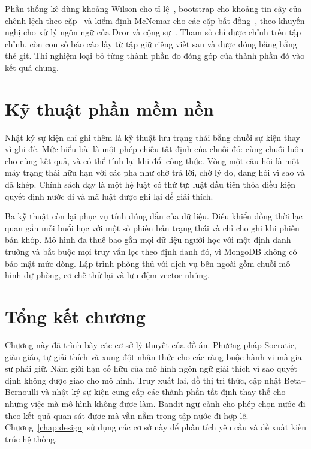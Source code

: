 Phần thống kê dùng khoảng Wilson cho tỉ lệ~\cite{wilson1927}, bootstrap cho khoảng tin cậy của chênh lệch theo cặp~\cite{efron1993} và kiểm định McNemar cho các cặp bất đồng~\cite{mcnemar1947}, theo khuyến nghị cho xử lý ngôn ngữ của Dror và cộng sự~\cite{dror2018}. Tham số chỉ được chỉnh trên tập chỉnh, còn con số báo cáo lấy từ tập giữ riêng viết sau và được đóng băng bằng thẻ git. Thí nghiệm loại bỏ từng thành phần đo đóng góp của thành phần đó vào kết quả chung.

\section{Kỹ thuật phần mềm nền}

Nhật ký sự kiện chỉ ghi thêm là kỹ thuật lưu trạng thái bằng chuỗi sự kiện thay vì ghi đè. Mức hiểu bài là một phép chiếu tất định của chuỗi đó: cùng chuỗi luôn cho cùng kết quả, và có thể tính lại khi đổi công thức. Vòng một câu hỏi là một máy trạng thái hữu hạn với các pha như chờ trả lời, chờ lý do, đang hỏi vì sao và đã khép. Chính sách dạy là một hệ luật có thứ tự: luật đầu tiên thỏa điều kiện quyết định nước đi và mã luật được ghi lại để giải thích.

Ba kỹ thuật còn lại phục vụ tính đúng đắn của dữ liệu. Điều khiển đồng thời lạc quan gắn mỗi buổi học với một số phiên bản trạng thái và chỉ cho ghi khi phiên bản khớp. Mô hình đa thuê bao gắn mọi dữ liệu người học với một định danh trường và bắt buộc mọi truy vấn lọc theo định danh đó, vì MongoDB không có bảo mật mức dòng. Lập trình phòng thủ với dịch vụ bên ngoài gồm chuỗi mô hình dự phòng, cơ chế thử lại và lưu đệm vector nhúng.

\section{Tổng kết chương}

Chương này đã trình bày các cơ sở lý thuyết của đồ án. Phương pháp Socratic, giàn giáo, tự giải thích và xung đột nhận thức cho các ràng buộc hành vi mà gia sư phải giữ. Năm giới hạn cố hữu của mô hình ngôn ngữ giải thích vì sao quyết định không được giao cho mô hình. Truy xuất lai, đồ thị tri thức, cập nhật Beta--Bernoulli và nhật ký sự kiện cung cấp các thành phần tất định thay thế cho những việc mà mô hình không được làm. Bandit ngữ cảnh cho phép chọn nước đi theo kết quả quan sát được mà vẫn nằm trong tập nước đi hợp lệ. Chương~\ref{chap:design} sử dụng các cơ sở này để phân tích yêu cầu và đề xuất kiến trúc hệ thống.
